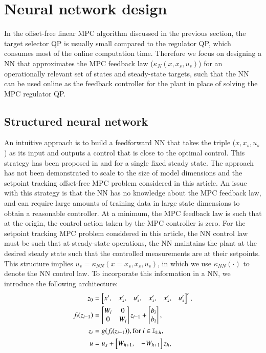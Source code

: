 \documentclass[preprint,5p, twocolumn, authoryear]{elsarticle}
\newcommand{\bbI}{\mathbb{I}}
\begin{document}
\section{Neural network design} \label{sec:controller_design}

In the offset-free linear MPC algorithm discussed in the previous section, the
target selector QP is usually small compared to the regulator QP, which consumes
most of the online computation time. Therefore we focus on designing a NN that
approximates the MPC feedback law ($\kappa_N(x, x_s, u_s)$) for an operationally
relevant set of states and steady-state targets, such that the NN can be used
online as the feedback controller for the plant in place of solving the MPC
regulator QP.

\subsection{Structured neural network}
An intuitive approach is to build a feedforward NN that takes the triple ($x,
x_s, u_s$) as its input and outputs a control that is close to the optimal
control. This strategy has been proposed in \cite{karg:lucia:2020} and 
\cite{chen:saulnier:atanasov:lee:kumar:pappas:morari:2018}
for a single fixed steady state. The approach has not been demonstrated to scale
to the size of model dimensions and the setpoint tracking offset-free MPC
problem considered in this article. An issue with this strategy is that the NN
has no knowledge about the MPC feedback law, and can require large amounts of
training data in large state dimensions to obtain a reasonable controller. At a
minimum, the MPC feedback law is such that at the origin, the control action
taken by the MPC controller is zero. For the setpoint tracking MPC problem
considered in this article, the NN control law must be such that at steady-state
operations, the NN maintains the plant at the desired steady state such that the
controlled measurements are at their setpoints. This structure implies $u_s =
\kappa_{NN}(x = x_s, x_s, u_s)$, in which we use $\kappa_{NN}(\cdot)$ to denote
the NN control law. To incorporate this information in a NN, we introduce the
following architecture:
\begin{align}
z_0 &= \begin{bmatrix}
    x', & x_s', & u_s', & x_s', & x_s', & u_s' \end{bmatrix}', \notag \\
    f_i(z_{i-1}) &= \begin{bmatrix}
        W_i & 0 \notag \\
        0 & W_i
          \end{bmatrix}z_{i-1}  + \begin{bmatrix}
            b_i \\
            b_i
            \end{bmatrix}, \notag\\
    z_i &= g(f_i(z_{i-1})), \textnormal{for} \ i \in \bbI_{1:h}, \notag \\
    u &= u_s + \begin{bmatrix}
  W_{h + 1}, & -W_{h + 1} \\
    \end{bmatrix} z_h,
\label{eq:NNstruct}
\end{align}
\end{document}
